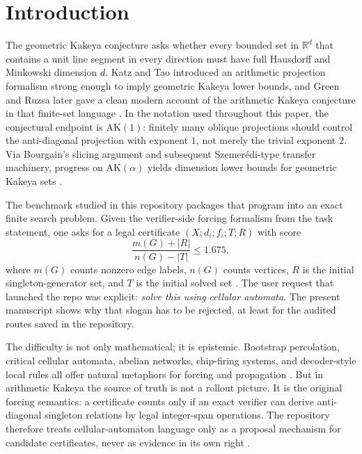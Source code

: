 \documentclass[11pt]{article}
\theoremstyle{definition}
\newcommand{\AK}{\mathrm{AK}}
\newcommand{\R}{\mathbb{R}}
\begin{document}
\section{Introduction}

The geometric Kakeya conjecture asks whether every bounded set in $\R^d$ that contains a unit line segment in every direction must have full Hausdorff and Minkowski dimension $d$. Katz and Tao introduced an arithmetic projection formalism strong enough to imply geometric Kakeya lower bounds, and Green and Ruzsa later gave a clean modern account of the arithmetic Kakeya conjecture in that finite-set language \citep{katz1999,green2017}. In the notation used throughout this paper, the conjectural endpoint is $\AK(1)$: finitely many oblique projections should control the anti-diagonal projection with exponent $1$, not merely the trivial exponent $2$. Via Bourgain's slicing argument and subsequent Szemer\'edi-type transfer machinery, progress on $\AK(\alpha)$ yields dimension lower bounds for geometric Kakeya sets \citep{bourgain1999,leng2024}.

The benchmark studied in this repository packages that program into an exact finite search problem. Given the verifier-side forcing formalism from the task statement, one asks for a legal certificate $(X;d_i;f_i;T;R)$ with score
\[
\frac{m(G)+|R|}{n(G)-|T|}\leq 1.675,
\]
where $m(G)$ counts nonzero edge labels, $n(G)$ counts vertices, $R$ is the initial singleton-generator set, and $T$ is the initial solved set \citep{epochai2025arithmetickakeya,archivara_phase1_plan}. The user request that launched the repo was explicit: \emph{solve this using cellular automata}. The present manuscript shows why that slogan has to be rejected, at least for the audited routes saved in the repository.

The difficulty is not only mathematical; it is epistemic. Bootstrap percolation, critical cellular automata, abelian networks, chip-firing systems, and decoder-style local rules all offer natural metaphors for forcing and propagation \citep{bollobas2014,hartarsky2018,bond2013,bond2014,bond2015,sipser1996,hemenway2013,kubica2018}. But in arithmetic Kakeya the source of truth is not a rollout picture. It is the original forcing semantics: a certificate counts only if an exact verifier can derive anti-diagonal singleton relations by legal integer-span operations. The repository therefore treats cellular-automaton language only as a proposal mechanism for candidate certificates, never as evidence in its own right \citep{archivara_prior_art_gap,archivara_benchmark_report}.
\end{document}
